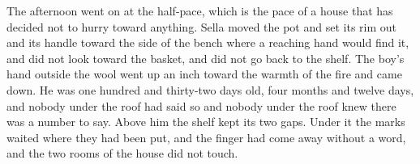 The afternoon went on at the half-pace, which is the pace of a house that has decided not to hurry toward anything. Sella moved the pot and set its rim out and its handle toward the side of the bench where a reaching hand would find it, and did not look toward the basket, and did not go back to the shelf. The boy's hand outside the wool went up an inch toward the warmth of the fire and came down. He was one hundred and thirty-two days old, four months and twelve days, and nobody under the roof had said so and nobody under the roof knew there was a number to say. Above him the shelf kept its two gaps. Under it the marks waited where they had been put, and the finger had come away without a word, and the two rooms of the house did not touch.
